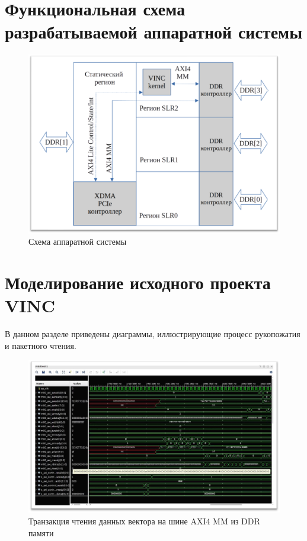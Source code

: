 \chapter{Функциональная схема разрабатываемой аппаратной
системы}

\begin{figure}
	\centering
	\includegraphics[width=\linewidth]{img/schema.png}
	\caption{Схема аппаратной системы}
\end{figure}

\chapter{Моделирование исходного проекта VINC}

В данном разделе приведены диаграммы, иллюстрирующие процесс рукопожатия и пакетного чтения.

\begin{figure}[ht]
	\centering
	\includegraphics[width=\linewidth]{img/inc-1.png}
	\caption{Транзакция чтения данных вектора на шине AXI4 MM из DDR
памяти}
\end{figure}

